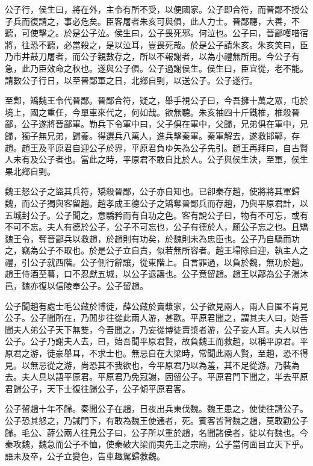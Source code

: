 公子行，侯生曰，將在外，主令有所不受，以便國家。公子即合符，而晉鄙不授公子兵而復請之，事必危矣。臣客屠者朱亥可與俱，此人力士。晉鄙聽，大善，不聽，可使擊之。於是公子泣。侯生曰，公子畏死邪。何泣也。公子曰，晉鄙嚄唶宿將，往恐不聽，必當殺之，是以泣耳，豈畏死哉。於是公子請朱亥。朱亥笑曰，臣乃市井鼓刀屠者，而公子親數存之，所以不報謝者，以為小禮無所用。今公子有急，此乃臣效命之秋也。遂與公子俱。公子過謝侯生。侯生曰，臣宜從，老不能。請數公子行日，以至晉鄙軍之日，北鄉自剄，以送公子。公子遂行。

至鄴，矯魏王令代晉鄙。晉鄙合符，疑之，舉手視公子曰，今吾擁十萬之眾，屯於境上，國之重任，今單車來代之，何如哉。欲無聽。朱亥袖四十斤鐵椎，椎殺晉鄙，公子遂將晉鄙軍。勒兵下令軍中曰，父子俱在軍中，父歸，兄弟俱在軍中，兄歸，獨子無兄弟，歸養。得選兵八萬人，進兵擊秦軍。秦軍解去，遂救邯鄲，存趙。趙王及平原君自迎公子於界，平原君負ゆ矢為公子先引。趙王再拜曰，自古賢人未有及公子者也。當此之時，平原君不敢自比於人。公子與侯生決，至軍，侯生果北鄉自剄。

魏王怒公子之盜其兵符，矯殺晉鄙，公子亦自知也。已卻秦存趙，使將將其軍歸魏，而公子獨與客留趙。趙孝成王德公子之矯奪晉鄙兵而存趙，乃與平原君計，以五城封公子。公子聞之，意驕矜而有自功之色。客有說公子曰，物有不可忘，或有不可不忘。夫人有德於公子，公子不可忘也，公子有德於人，願公子忘之也。且矯魏王令，奪晉鄙兵以救趙，於趙則有功矣，於魏則未為忠臣也。公子乃自驕而功之，竊為公子不取也。於是公子立自責，似若無所容者。趙王埽除自迎，執主人之禮，引公子就西階。公子側行辭讓，從東階上。自言罪過，以負於魏，無功於趙。趙王侍酒至暮，口不忍獻五城，以公子退讓也。公子竟留趙。趙王以鄗為公子湯沐邑，魏亦復以信陵奉公子。公子留趙。

公子聞趙有處士毛公藏於博徒，薛公藏於賣漿家，公子欲見兩人，兩人自匿不肯見公子。公子聞所在，乃閒步往從此兩人游，甚歡。平原君聞之，謂其夫人曰，始吾聞夫人弟公子天下無雙，今吾聞之，乃妄從博徒賣漿者游，公子妄人耳。夫人以告公子。公子乃謝夫人去，曰，始吾聞平原君賢，故負魏王而救趙，以稱平原君。平原君之游，徒豪舉耳，不求士也。無忌自在大梁時，常聞此兩人賢，至趙，恐不得見。以無忌從之游，尚恐其不我欲也，今平原君乃以為羞，其不足從游。乃裝為去。夫人具以語平原君。平原君乃免冠謝，固留公子。平原君門下聞之，半去平原君歸公子，天下士復往歸公子，公子傾平原君客。

公子留趙十年不歸。秦聞公子在趙，日夜出兵東伐魏。魏王患之，使使往請公子。公子恐其怒之，乃誡門下，有敢為魏王使通者，死。賓客皆背魏之趙，莫敢勸公子歸。毛公、薛公兩人往見公子曰，公子所以重於趙，名聞諸侯者，徒以有魏也。今秦攻魏，魏急而公子不恤，使秦破大梁而夷先王之宗廟，公子當何面目立天下乎。語未及卒，公子立變色，告車趣駕歸救魏。

